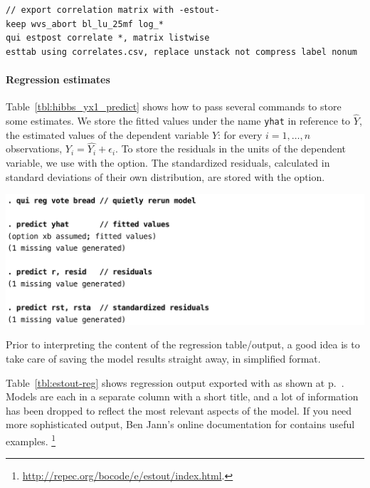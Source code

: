 \begin{verbatim}
// export correlation matrix with -estout-
keep wvs_abort bl_lu_25mf log_*
qui estpost correlate *, matrix listwise
esttab using correlates.csv, replace unstack not compress label nonum
\end{verbatim}

%
%
%
\paragraph{Regression estimates}

Table~\ref{tbl:hibbs_yx1_predict} shows how to pass several  commands to store some estimates. We store the fitted values under the name \texttt{yhat} in reference to $\hat{Y}$, the estimated values of the dependent variable $Y$: for every $i=1, \ldots, n$ observations, $Y_i = \hat{Y_i} + \epsilon_i$. To store the residuals in the units of the dependent variable, we use  with the  option. The standardized residuals, calculated in standard deviations of their own distribution, are stored with the  option.

\begin{table}[htp]
	\includegraphics[scale=.5]{images/hibbs_yx1_predict.pdf}

	\caption[Storing estimates with ]{\label{tbl:hibbs_yx1_predict}%
	Storing estimates with . %
	\hibbs}
\end{table}%

Prior to interpreting the content of the regression table/output, a good idea is to take care of saving the model results straight away, in simplified format.

Table~\ref{tbl:estout-reg} shows regression output exported with  as shown at p.~\pageref{tbl:hibbs_yx1_estout}. Models are each in a separate column with a short title, and a lot of information has been dropped to reflect the most relevant aspects of the model. If you need more sophisticated output, Ben Jann's online documentation for  contains useful examples.%
\footnote{\url{http://repec.org/bocode/e/estout/index.html}.}

